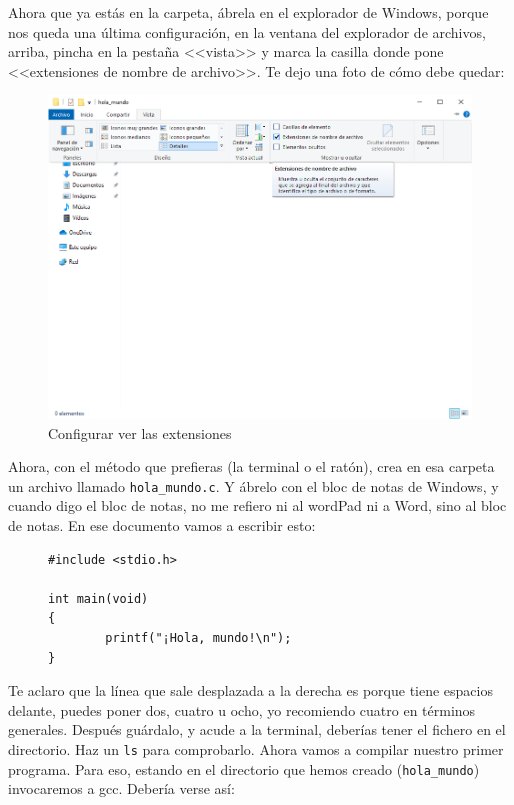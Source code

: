 \documentclass[a4paper]{article}
\begin{document}
Ahora que ya estás en la carpeta, ábrela en el explorador de Windows, porque
nos queda una última configuración, en la ventana del explorador de archivos,
arriba, pincha en la pestaña <<vista>> y marca la casilla donde pone
<<extensiones de nombre de archivo>>. Te dejo una foto de cómo debe quedar:

\begin{figure}[H]
    \includegraphics[width=\linewidth]{extensions}
    \caption{Configurar ver las extensiones}
    \label{img:extensions}
\end{figure}

Ahora, con el método que prefieras (la terminal o el ratón), crea en esa
carpeta un archivo llamado \verb!hola_mundo.c!. Y ábrelo con el bloc de notas
de Windows, y cuando digo el bloc de notas, no me refiero ni al wordPad ni a
Word, sino al bloc de notas. En ese documento vamos a escribir esto:

\begin{figure}[H]
\begin{verbatim}
#include <stdio.h>

int main(void)
{
        printf("¡Hola, mundo!\n");
}
\end{verbatim}
\end{figure}

Te aclaro que la línea que sale desplazada a la derecha es porque tiene
espacios delante, puedes poner dos, cuatro u ocho, yo recomiendo cuatro en
términos generales.
Después guárdalo, y acude a la terminal, deberías tener el fichero en el
directorio. Haz un \verb!ls! para comprobarlo. Ahora vamos a compilar nuestro
primer programa. Para eso, estando en el directorio que hemos creado
(\verb!hola_mundo!) invocaremos a gcc. Debería verse así:
\end{document}
